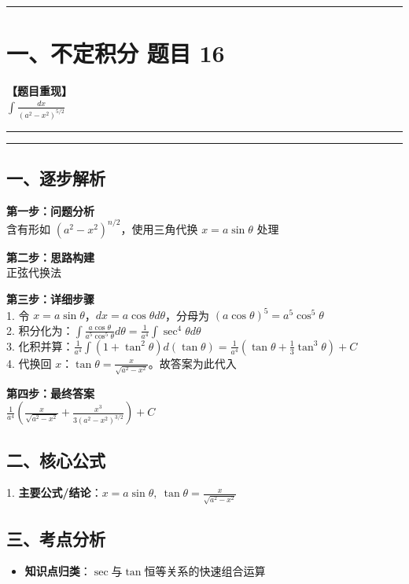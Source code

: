﻿\documentclass[12pt, a4paper]{ctexart}
\newcommand{\TopSeparator}{
    \par\noindent\rule{\textwidth}{1.5pt}\vspace{0.5em}
}
\newcommand{\AnalysisSeparator}{
    \par\noindent\rule{\textwidth}{0.5pt}\vspace{0.2em}\hrule\vspace{0.5em}
}
\newenvironment{RedAnalysis}{
    \par
    \color{red} 
}{
    \par
    \color{black} 
}
\begin{document}
\vspace{2em}

\TopSeparator
\section*{一、不定积分 题目 16}

\textbf{【题目重现】} \\
$\int \frac{dx}{(a^2-x^2)^{5/2}}$

\AnalysisSeparator

\begin{RedAnalysis}

	\subsection*{一、逐步解析}

	\textbf{第一步：问题分析} \\
	含有形如 $(a^2-x^2)^{n/2}$，使用三角代换 $x=a\sin\theta$ 处理

	\textbf{第二步：思路构建} \\
	正弦代换法

	\textbf{第三步：详细步骤} \\
	1. 令 $x = a\sin\theta$，$dx = a\cos\theta d\theta$，分母为 $(a\cos\theta)^5 = a^5\cos^5\theta$ \\ 
	2. 积分化为：$\int \frac{a\cos\theta}{a^5\cos^5\theta} d\theta = \frac{1}{a^4}\int \sec^4\theta d\theta$ \\ 
	3. 化积并算：$\frac{1}{a^4}\int (1+\tan^2\theta) d(\tan\theta) = \frac{1}{a^4}(\tan\theta + \frac{1}{3}\tan^3\theta) + C$ \\ 
	4. 代换回 $x$：$\tan\theta = \frac{x}{\sqrt{a^2-x^2}}$。故答案为此代入

	\textbf{第四步：最终答案} \\
	$\frac{1}{a^4} \left( \frac{x}{\sqrt{a^2-x^2}} + \frac{x^3}{3(a^2-x^2)^{3/2}} \right) + C$

	\subsection*{二、核心公式}
	1. \textbf{主要公式/结论}：$x = a\sin\theta, \ \tan\theta = \frac{x}{\sqrt{a^2-x^2}}$

	\subsection*{三、考点分析}
	\begin{itemize}
		\item \textbf{知识点归类}：$\sec$与$\tan$恒等关系的快速组合运算
	\end{itemize}

\end{RedAnalysis}
\end{document}
